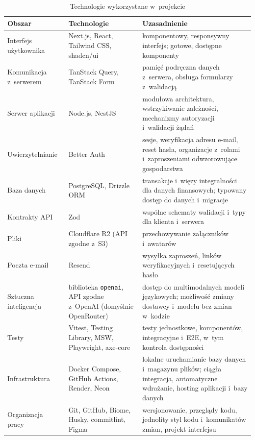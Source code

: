 \begin{table}[H]
  \centering
  \caption{Technologie wykorzystane w~projekcie}
  \label{tab:technologie}
  \begin{tabularx}{\textwidth}{@{}>{\raggedright\arraybackslash}p{}>{\raggedright\arraybackslash}p{}L@{}}
    \toprule
    Obszar & Technologie & Uzasadnienie \\
    \midrule
    Interfejs użytkownika & Next.js, React, Tailwind CSS, shadcn/ui & komponentowy, responsywny interfejs; gotowe, dostępne komponenty \\
    Komunikacja z~serwerem & TanStack Query, TanStack Form & pamięć podręczna danych z~serwera, obsługa formularzy z~walidacją \\
    Serwer aplikacji & Node.js, NestJS & modułowa architektura, wstrzykiwanie zależności, mechanizmy autoryzacji i~walidacji żądań \\
    Uwierzytelnianie & Better Auth & sesje, weryfikacja adresu e-mail, reset hasła, organizacje z~rolami i~zaproszeniami odwzorowujące gospodarstwa \\
    Baza danych & PostgreSQL, Drizzle ORM & transakcje i~więzy integralności dla danych finansowych; typowany dostęp do danych i~migracje \\
    Kontrakty API & Zod & wspólne schematy walidacji i~typy dla klienta i~serwera \\
    Pliki & Cloudflare R2 (API zgodne z~S3) & przechowywanie załączników i~awatarów \\
    Poczta e-mail & Resend & wysyłka zaproszeń, linków weryfikacyjnych i~resetujących hasło \\
    Sztuczna inteligencja & biblioteka \texttt{openai}, API zgodne z~OpenAI (domyślnie OpenRouter) & dostęp do multimodalnych modeli językowych; możliwość zmiany dostawcy i~modelu bez zmian w~kodzie \\
    Testy & Vitest, Testing Library, MSW, Playwright, axe-core & testy jednostkowe, komponentów, integracyjne i~E2E, w~tym kontrola dostępności \\
    Infrastruktura & Docker Compose, GitHub Actions, Render, Neon & lokalne uruchamianie bazy danych i~magazynu plików; ciągła integracja, automatyczne wdrażanie, hosting aplikacji i~bazy danych \\
    Organizacja pracy & Git, GitHub, Biome, Husky, commitlint, Figma & wersjonowanie, przeglądy kodu, jednolity styl kodu i~komunikatów zmian, projekt interfejsu \\
    \bottomrule
  \end{tabularx}
\end{table}


